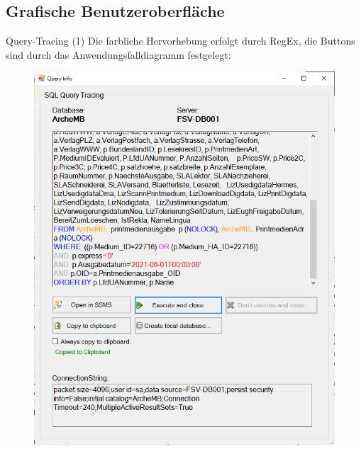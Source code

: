 \documentclass[toc]{beamer}
\begin{document}
    \subsection{Grafische Benutzeroberfläche}
        \begin{frame}{Query-Tracing (1)}
        Die farbliche Hervorhebung erfolgt durch RegEx, die Buttons sind durch das Anwendungsfalldiagramm festgelegt:
            \begin{figure}[htp]
                \includegraphics[scale=0.5]{gui.png}
            \end{figure}
        \end{frame}
        
\end{document}
